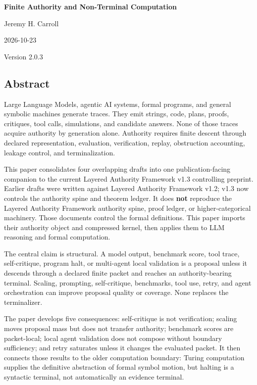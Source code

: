 \documentclass[
  10pt,
]{article}
\author{}
\date{}
\begin{document}
\begin{center}
{\LARGE\bfseries Finite Authority and Non-Terminal Computation\par}
Jeremy H. Carroll\par
2026-10-23\par
Version 2.0.3\par
\end{center}

\subsection{Abstract}\label{abstract}

Large Language Models, agentic AI systems, formal programs, and general symbolic machines generate traces. They emit strings, code, plans, proofs, critiques, tool calls, simulations, and candidate answers. None of those traces acquire authority by generation alone. Authority requires finite descent through declared representation, evaluation, verification, replay, obstruction accounting, leakage control, and terminalization.

This paper consolidates four overlapping drafts into one publication-facing companion to the current Layered Authority Framework v1.3 controlling preprint. Earlier drafts were written against Layered Authority Framework v1.2; v1.3 now controls the authority spine and theorem ledger. It does \textbf{not} reproduce the Layered Authority Framework authority spine, proof ledger, or higher-categorical machinery. Those documents control the formal definitions. This paper imports their authority object and compressed kernel, then applies them to LLM reasoning and formal computation.

The central claim is structural. A model output, benchmark score, tool trace, self-critique, program halt, or multi-agent local validation is a proposal unless it descends through a declared finite packet and reaches an authority-bearing terminal. Scaling, prompting, self-critique, benchmarks, tool use, retry, and agent orchestration can improve proposal quality or coverage. None replaces the terminalizer.

The paper develops five consequences: self-critique is not verification; scaling moves proposal mass but does not transfer authority; benchmark scores are packet-local; local agent validation does not compose without boundary sufficiency; and retry saturates unless it changes the evaluated packet. It then connects those results to the older computation boundary: Turing computation supplies the definitive abstraction of formal symbol motion, but halting is a syntactic terminal, not automatically an evidence terminal.
\end{document}
